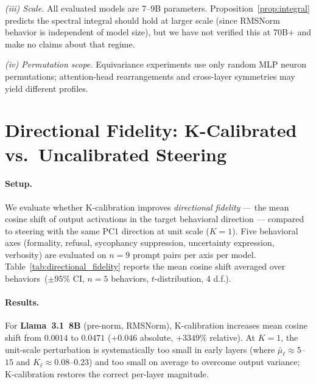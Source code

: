 \documentclass{article}
\newcommand{\mubar}{\bar{\mu}}
\begin{document}
\textit{(iii) Scale.}
All evaluated models are 7--9B parameters.
Proposition~\ref{prop:integral} predicts the spectral integral should hold at larger
scale (since RMSNorm behavior is independent of model size), but we have not verified
this at 70B+ and make no claims about that regime.

\textit{(iv) Permutation scope.}
Equivariance experiments use only random MLP neuron permutations; attention-head
rearrangements and cross-layer symmetries may yield different profiles.




\appendix

\section{Directional Fidelity: K-Calibrated vs.\ Uncalibrated Steering}
\label{app:directional_fidelity}

\paragraph{Setup.}
We evaluate whether K-calibration improves \emph{directional fidelity} —
the mean cosine shift of output activations in the target behavioral direction —
compared to steering with the same PC1 direction at unit scale ($K{=}1$).
Five behavioral axes (formality, refusal, sycophancy suppression, uncertainty
expression, verbosity) are evaluated on $n{=}9$ prompt pairs per axis per model.
Table~\ref{tab:directional_fidelity} reports the mean cosine shift averaged
over behaviors~($\pm 95\%$ CI, $n{=}5$ behaviors, $t$-distribution, 4 d.f.).

\paragraph{Results.}
For \textbf{Llama~3.1~8B} (pre-norm, RMSNorm), K-calibration increases mean
cosine shift from $0.0014$ to $0.0471$ ($+0.046$ absolute, $+3349\%$ relative).
At $K{=}1$, the unit-scale perturbation is systematically too small in
early layers (where $\mubar_\ell \approx 5$--$15$ and $K_\ell \approx 0.08$--$0.23$)
and too small on average to overcome output variance; K-calibration restores
the correct per-layer magnitude.
\end{document}

